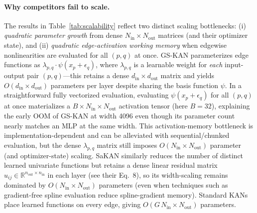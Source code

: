 \documentclass{article}
\theoremstyle{plain}
\theoremstyle{definition}
\theoremstyle{remark}
\begin{document}
\paragraph{Why competitors fail to scale.}
The results in Table~\ref{tab:scalability} reflect two distinct scaling bottlenecks: (i) \emph{quadratic parameter growth} from dense $N_{\mathrm{in}}\times N_{\mathrm{out}}$ matrices (and their optimizer state), and (ii) \emph{quadratic edge-activation working memory} when edgewise nonlinearities are evaluated for all $(p,q)$ at once. GS-KAN \cite{eliasson2025gskan} parameterizes edge functions as $\lambda_{p,q} \cdot \psi(x_p + \epsilon_q)$, where $\lambda_{p,q}$ is a learnable weight for \emph{each} input-output pair $(p,q)$---this retains a dense $d_{\mathrm{in}}\times d_{\mathrm{out}}$ matrix and yields $O(d_{\mathrm{in}} \times d_{\mathrm{out}})$ parameters per layer despite sharing the basis function $\psi$. In a straightforward fully vectorized evaluation, evaluating $\psi(x_p+\epsilon_q)$ for all $(p,q)$ at once materializes a $B \times N_{\mathrm{in}} \times N_{\mathrm{out}}$ activation tensor (here $B=32$), explaining the early OOM of GS-KAN at width 4096 even though its parameter count nearly matches an MLP at the same width. This activation-memory bottleneck is implementation-dependent and can be alleviated with sequential/chunked evaluation, but the dense $\lambda_{p,q}$ matrix still imposes $O(N_{\mathrm{in}} \times N_{\mathrm{out}})$ parameter (and optimizer-state) scaling. SaKAN \cite{sakan2025} similarly reduces the number of distinct learned univariate functions but retains a dense linear residual matrix $u_{ij} \in \mathbb{R}^{n_{\mathrm{out}} \times n_{\mathrm{in}}}$ in each layer (see their Eq.~8), so its width-scaling remains dominated by $O(N_{\mathrm{in}} \times N_{\mathrm{out}})$ parameters (even when techniques such as gradient-free spline evaluation reduce spline-gradient memory). Standard KANs \cite{liu2024kan} place learned functions on every edge, giving $O(G\,N_{\mathrm{in}}\times N_{\mathrm{out}})$ parameters.
\end{document}
